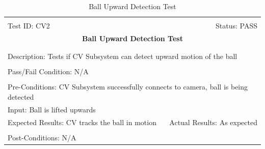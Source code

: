 \documentclass[11pt]{article}
\begin{document}
\begin{center}
\begin{table}[H]
\begin{tabular}{|l r|}\hline&\\[-2mm]
	Test ID: CV2	&Status: PASS\\[-3mm]
	\multicolumn{2}{|c|}{\textbf{\large{Ball Upward Detection Test}}}\\&\\\hline&\\[-3mm]
	\multicolumn{2}{|p{\textwidth}|}{Description: Tests if CV Subsystem can detect upward motion of the ball}\\[1mm]\hline&\\[-3mm]
	\multicolumn{2}{|p{\textwidth}|}{Pass/Fail Condition: N/A }\\[1mm]\hline&\\[-3mm]
	\multicolumn{2}{|p{\textwidth}|}{Pre-Conditions: CV Subsystem successfully connects to camera, ball is being detected}\\[4mm]
	\multicolumn{2}{|p{\textwidth}|}{Input: Ball is lifted upwards}\\[2mm]\hline
	\multicolumn{1}{|p{0.49\textwidth}}{Expected Results: CV tracks the ball in motion}	&\multicolumn{1}{|p{0.45\textwidth}|}{Actual Results: As expected}\\\hline&\\[-3mm]
	\multicolumn{2}{|p{\textwidth}|}{Post-Conditions: N/A}\\\hline
\end{tabular}
\caption{Ball Upward Detection Test}
\end{table}
\end{center}
\end{document}
